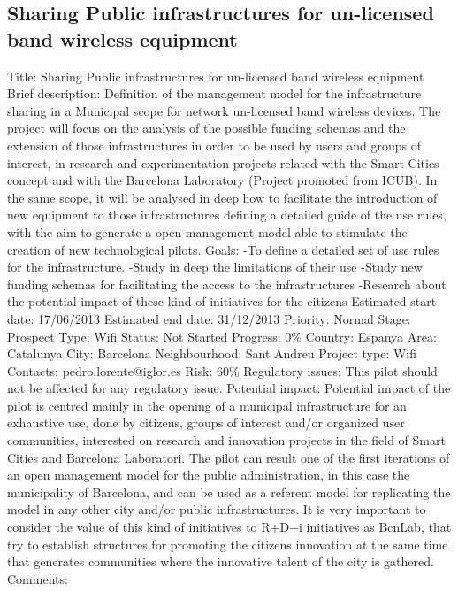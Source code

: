 \documentclass[draftclsnofoot,12pt,journal,onecolumn]{IEEEtran}
\begin{document}
\subsection{Sharing Public infrastructures for un-licensed band wireless equipment} 
Title: Sharing Public infrastructures for un-licensed band wireless equipment 
Brief description: Definition of the management model for the infrastructure 
sharing in a Municipal scope for network un-licensed band wireless devices. 
The project will focus on the analysis of the possible funding schemas and 
the extension of those infrastructures in order to be used by users and 
groups of interest, in research and experimentation projects related with the 
Smart Cities concept and with the Barcelona Laboratory (Project promoted from 
ICUB). In the same scope, it will be analysed in deep how to facilitate the 
introduction of new equipment to those infrastructures defining a detailed 
guide of the use rules, with the aim to generate a open management model able 
to stimulate the creation of new technological pilots. 
Goals: 
-To define a detailed set of use rules for the infrastructure. 
-Study in deep the limitations of their use 
-Study new funding schemas for facilitating the access to the infrastructures 
-Research about the potential impact of these kind of initiatives for the 
citizens 
Estimated start date: 17/06/2013 
Estimated end date: 31/12/2013 
Priority: Normal 
Stage: Prospect 
Type: Wifi 
Status: Not Started 
Progress: 0\% 
Country: Espanya 
Area: Catalunya 
City: Barcelona 
Neighbourhood: Sant Andreu 
Project type: Wifi 
Contacts: pedro.lorente@iglor.es
Risk: 60\% 
Regulatory issues: This pilot should not be affected for any regulatory 
issue. 
Potential impact: 
Potential impact of the pilot is centred mainly in the opening of a municipal 
infrastructure for an exhaustive use, done by citizens, groups of interest 
and/or organized user communities, interested on research and innovation 
projects in the field of Smart Cities and Barcelona Laboratori. 
The pilot can result one of the first iterations of an open management model 
for the public administration, in this case the municipality of Barcelona, 
and can be used as a referent model for replicating the model in any other 
city and/or public infrastructures. 
It is very important to consider the value of this kind of initiatives to 
R+D+i initiatives as BcnLab, that try to establish structures for promoting 
the citizens innovation at the same time that generates communities where the 
innovative talent of the city is gathered. 
Comments: 
\end{document}
